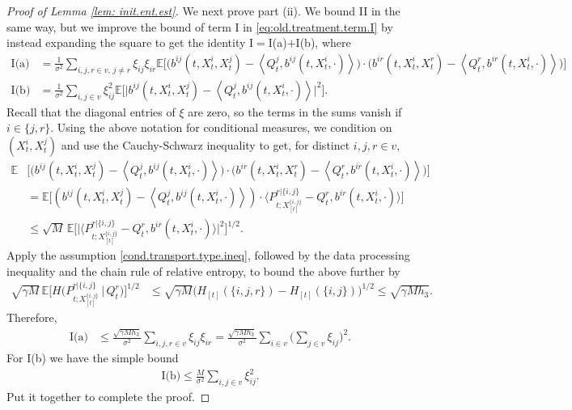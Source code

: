 \documentclass[11pt,reqno]{amsart}
\numberwithin{equation}{section}
\theoremstyle{definition}
\def\E{{\mathbb E}}
\begin{document}
\begin{proof}[Proof of Lemma \ref{lem: init.ent.est}]
		
		We next prove part (ii). We bound II in the same way, but we improve the bound of term I in \eqref{eq:old.treatment.term.I} by instead expanding the square to get the identity  I$=$I(a)$+$I(b), where
\begin{align*}
	\text{I(a)}
	&= \frac{1}{\sigma^2}\!\!\! \sum_{i,j,r \in v, \, j \neq r }\!\!\!\! \xi_{ij} \xi_{i r}\E \Big[\Big( b^{ij}(t, X^i_t, X^j_t) - \left\langle Q^{j}_t, b^{ij}(t, X^i_t, \cdot) \right\rangle \Big) \cdot \Big( b^{ir}(t, X^i_t, X^r_t) - \left\langle Q^{r}_t, b^{ir}(t, X^i_t, \cdot) \right\rangle \Big) \Big]\\
	\text{I(b)} & =\frac{1}{\sigma^2} \sum_{i,j \in v} \xi_{ij}^2 \E \Big[\Big| b^{ij}(t, X^i_t, X^j_t) - \left\langle Q^{j}_t, b^{ij}(t, X^i_t, \cdot) \right\rangle \Big|^2\Big].
\end{align*}
Recall that the diagonal entries of $\xi$ are zero, so the terms in the sums vanish if $i \in \{j,r\}$.
Using the above notation for conditional measures, we condition on $ (X^i_t, X^j_t) $ and use the Cauchy-Schwarz inequality to get, for distinct $i,j,r \in v$, 
\begin{align*}
	\E &\Big[\Big( b^{ij}(t, X^i_t, X^j_t) - \left\langle Q^{j}_t, b^{ij}(t, X^i_t, \cdot) \right\rangle \Big) \cdot \Big( b^{ir}(t, X^i_t, X^r_t) - \left\langle Q^{r}_t, b^{ir}(t, X^i_t, \cdot) \right\rangle \Big) \Big] \\
	&= \E \Big[\left( b^{ij}(t, X^i_t, X^j_t) - \left\langle Q^{j}_t, b^{ij}(t, X^i_t, \cdot) \right\rangle \right) \cdot  \Big\langle P^{r | \{i,j\}}_{t;X^{\{i,j\}}_{[t]}} - Q^{r}_t, b^{ir}(t, X^i_t, \cdot) \Big\rangle  \Big]\\ 
		&\le   \sqrt{M} \, \E \Big[ \big| \big\langle P^{r | \{i,j\}}_{t;X^{\{i,j\}}_{[t]}} - Q^{r}_t, b^{ir}(t, X^i_t, \cdot) \big\rangle \big|^2  \Big]^{1/2}.
\end{align*}
Apply the assumption \eqref{cond.transport.type.ineq}, followed by the data processing inequality and the chain rule of relative entropy, to bound the above further by
\begin{align*}
\sqrt{\gamma M } \, \E\Big[H\big(P^{r | \{i,j\}}_{t;X^{\{i,j\}}_{[t]}} \,\big|\, Q^r_t\big)\Big]^{1/2} &\le \sqrt{\gamma M}\Big(H_{[t]}(\{i,j,r\}) - H_{[t]}(\{i,j\})\Big)^{1/2} \le 	 \sqrt{\gamma M h_3} .
\end{align*}
Therefore,  
\begin{align*}
	\text{I(a)}&\le \frac{ \sqrt{\gamma M h_3}}{\sigma^2} \sum_{i,j,r \in v} \xi_{ij} \xi_{i r} = \frac{ \sqrt{\gamma M h_3}}{\sigma^2} \sum_{i \in v}\bigg(\sum_{j \in v}\xi_{ij}\bigg)^2.
\end{align*}
For I(b) we have the simple bound 
\begin{align*}
	\text{I(b)} \le \frac{M}{\sigma^2} \sum_{i,j \in v} \xi_{ij}^2.
\end{align*} 
Put it together to complete the proof.
		\end{proof}
\end{document}
